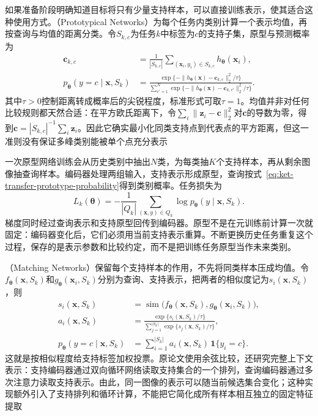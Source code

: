如果准备阶段明确知道目标将只有少量支持样本，可以直接训练表示，使其适合这种使用方式。（Prototypical Networks）为每个任务内类别计算一个表示均值，再按查询与均值的距离分类。令$S_{k,c}$为任务$k$中标签为$c$的支持子集，原型与预测概率为
\begin{align}
  \bm c_{k,c}
  &=\frac{1}{|S_{k,c}|}
    \sum_{(\bm x_i,y_i)\in S_{k,c}}h_{\bm{\theta}}(\bm x_i),
    \label{eq:ket-transfer-prototype}\\
  p_{\bm{\theta}}(y=c\mid\bm x,S_k)
  &=\frac{\exp\{-\|h_{\bm{\theta}}(\bm x)-\bm c_{k,c}\|_2^2/\tau\}}
    {\sum_{c'=1}^{N}\exp\{-\|h_{\bm{\theta}}(\bm x)-\bm c_{k,c'}\|_2^2/\tau\}}.
    \label{eq:ket-transfer-prototype-probability}
\end{align}
其中$\tau>0$控制距离转成概率后的尖锐程度，标准形式可取$\tau=1$。均值并非对任何比较规则都天然合适：在平方欧氏距离下，令$\sum_i\|\bm z_i-\bm c\|_2^2$对$\bm c$的导数为零，得到$\bm c=|S_{k,c}|^{-1}\sum_i\bm z_i$。因此它确实最小化同类支持点到代表点的平方距离，但这一准则没有保证多峰类别能被单个点充分表示

一次原型网络训练会从历史类别中抽出$N$类，为每类抽$K$个支持样本，再从剩余图像抽查询样本。编码器处理两组输入，支持表示形成原型，查询按式~\eqref{eq:ket-transfer-prototype-probability}得到类别概率。任务损失为
\begin{equation}
  L_k(\bm{\theta})
  =-\frac{1}{|Q_k|}\sum_{(\bm x,y)\in Q_k}
  \log p_{\bm{\theta}}(y\mid\bm x,S_k).
  \label{eq:ket-transfer-episodic-loss}
\end{equation}
梯度同时经过查询表示和支持原型回传到编码器。原型不是在元训练前计算一次就固定：编码器变化后，它们必须用当前支持表示重算。不断更换历史任务重复这个过程，保存的是表示参数和比较约定，而不是把训练任务原型当作未来类别。

（Matching Networks）保留每个支持样本的作用，不先将同类样本压成均值。令$f_{\bm{\theta}}(\bm x,S_k)$和$g_{\bm{\theta}}(\bm x_i,S_k)$分别为查询、支持表示，把两者的相似度记为$s_i(\bm x,S_k)$，则
\begin{align}
  s_i(\bm x,S_k)
  &=\operatorname{sim}\bigl(f_{\bm{\theta}}(\bm x,S_k),
       g_{\bm{\theta}}(\bm x_i,S_k)\bigr), \nonumber\\
  a_i(\bm x,S_k)
  &=\frac{\exp\{s_i(\bm x,S_k)/\tau\}}
  {\sum_{j=1}^{|S_k|}\exp\{s_j(\bm x,S_k)/\tau\}}, \nonumber\\
  p_{\bm{\theta}}(y=c\mid\bm x,S_k)
  &=\sum_{i=1}^{|S_k|}a_i(\bm x,S_k)\,\mathbf 1\{y_i=c\}.
  \label{eq:ket-transfer-matching}
\end{align}
这就是按相似程度给支持标签加权投票。原论文使用余弦比较，还研究完整上下文表示：支持编码器通过双向循环网络读取支持集合的一个排列，查询编码器通过多次注意力读取支持表示。由此，同一图像的表示可以随当前候选集合变化；这种实现额外引入了支持排列和循环计算，不能把它简化成所有样本相互独立的固定特征提取

